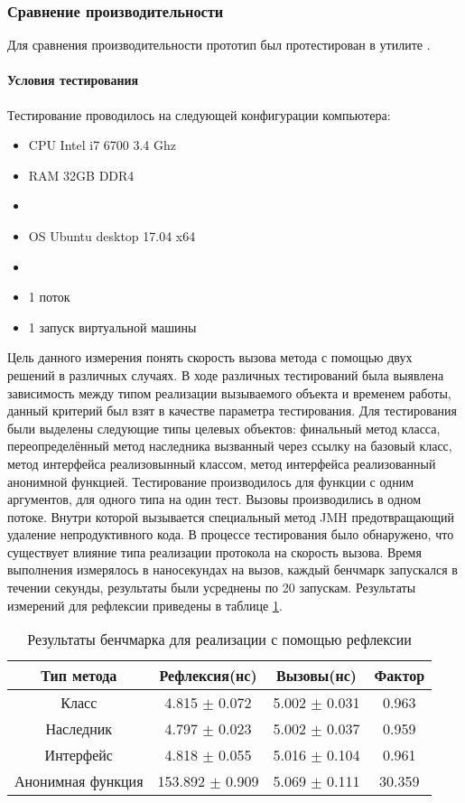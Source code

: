 \subsubsection{Сравнение производительности}
Для сравнения производительности прототип был протестирован в утилите .
\paragraph{Условия тестирования}
Тестирование проводилось на следующей конфигурации компьютера:
\begin{itemize}
    \item CPU Intel i7 6700 3.4 Ghz
    \item RAM 32GB DDR4
    \item {}
    \item OS Ubuntu desktop 17.04 x64
    \item {}
    \item 1 поток
    \item 1 запуск виртуальной машины
\end{itemize}

Цель данного измерения понять скорость вызова метода с помощью двух решений в различных случаях. В ходе различных тестирований была выявлена зависимость между типом реализации вызываемого объекта и временем работы, данный критерий был взят в качестве параметра тестирования. Для тестирования были выделены следующие типы целевых объектов: финальный метод класса, переопределённый метод наследника вызванный через ссылку на базовый класс, метод интерфейса реализовынный классом, метод интерфейса реализованный анонимной функцией. Тестирование производилось для функции с одним аргументов, для одного типа на один тест. Вызовы производились в одном потоке. Внутри которой вызывается специальный метод JMH предотвращающий удаление непродуктивного кода. В процессе тестирования было обнаружено, что существует влияние типа реализации протокола на скорость вызова. Время выполнения измерялось в наносекундах на вызов, каждый бенчмарк запускался в течении секунды, результаты были усреднены по 20 запускам. Результаты измерений для рефлексии приведены в таблице \ref{benchmark:prototype}.
\begin{table}[h]
\begin{center}
\begin{tabular}{|c|c|c|c|} \hline
Тип метода & Рефлексия(нс) &  Вызовы(нс) & Фактор \\ \hline
Класс & 4.815 $\pm$ 0.072 & 5.002 $\pm$ 0.031 & 0.963 \\ \hline
Наследник & 4.797 $\pm$ 0.023 & 5.002 $\pm$ 0.037 & 0.959 \\ \hline
Интерфейс & 4.818 $\pm$ 0.055 & 5.016 $\pm$ 0.104 & 0.961 \\ \hline
Анонимная функция & 153.892 $\pm$ 0.909 & 5.069 $\pm$ 0.111 & 30.359 \\ \hline
\end{tabular}
\caption{Результаты бенчмарка для реализации с помощью рефлексии}
\label{benchmark:prototype}
\end{center}
\end{table}

